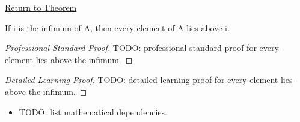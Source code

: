 \newpage
{}
\label{prf:every-element-lies-above-the-infimum}

\begin{remark*}[Return]
\hyperref[prop:every-element-lies-above-the-infimum]{Return to Theorem}
\end{remark*}

\begin{proposition*}
If i is the infimum of A, then every element of A lies above i.
\end{proposition*}

\begin{proof}[Professional Standard Proof]
\LRAProofBodyStart
TODO: professional standard proof for every-element-lies-above-the-infimum.
\end{proof}

\begin{proof}[Detailed Learning Proof]
\LRAProofBodyStart
TODO: detailed learning proof for every-element-lies-above-the-infimum.
\end{proof}

\begin{remark*}
\end{remark*}

\begin{dependencies}
\begin{itemize}
  \item TODO: list mathematical dependencies.
\end{itemize}
\end{dependencies}

\clearpage
